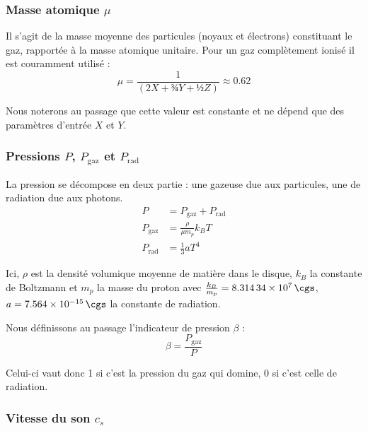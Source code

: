 \subsubsection{\texorpdfstring{Masse atomique $\mu$}{Masse atomique μ}}

Il s’agit de la masse moyenne des particules (noyaux et électrons) constituant
le gaz, rapportée à la masse atomique unitaire. Pour un gaz complètement ionisé
il est couramment utilisé :
\begin{equation}
    \label{eq:masse_atomique}
    \mu = \frac{1}{\left(2X + ¾Y + ½Z\right)} \approx 0.62
\end{equation}

Nous noterons au passage que cette valeur est constante et ne dépend que des
paramètres d’entrée $X$ et $Y$.

\subsubsection{\texorpdfstring{Pressions $P$, $P_\mathrm{gaz}$ et $P_\mathrm{rad}$}{Pressions P, Pgaz et Prad}}

La pression se décompose en deux partie : une gazeuse due aux particules, une de radiation due aux photons.
\begin{align}
    \label{eq:pression}
    P &= P_{\mathrm{gaz}} + P_{\mathrm{rad}} \\
    P_{\mathrm{gaz}} &= \frac{\rho}{\mu m_p} k_B T \\
    P_{\mathrm{rad}} &= \frac{1}{3} a T^4
\end{align}

Ici, $\rho$ est la densité volumique moyenne de matière dans le disque, $k_B$
la constante de Boltzmann et $m_p$ la masse du proton avec $\frac{k_B}{m_p} =
\SI{8.31434e7}{\cgs}$, $a = \SI{7.564e-15}{\cgs}$ la constante de radiation.

Nous définissons au passage l’indicateur de pression $\beta$ :
\begin{equation}
    \label{eq:beta}
    \beta = \frac{P_{\mathrm{gaz}}}{P}
\end{equation}

Celui-ci vaut donc 1 si c’est la pression du gaz qui domine, 0 si c’est celle de radiation.

\subsubsection{\texorpdfstring{Vitesse du son $c_s$}{Vitesse du son cs}}

